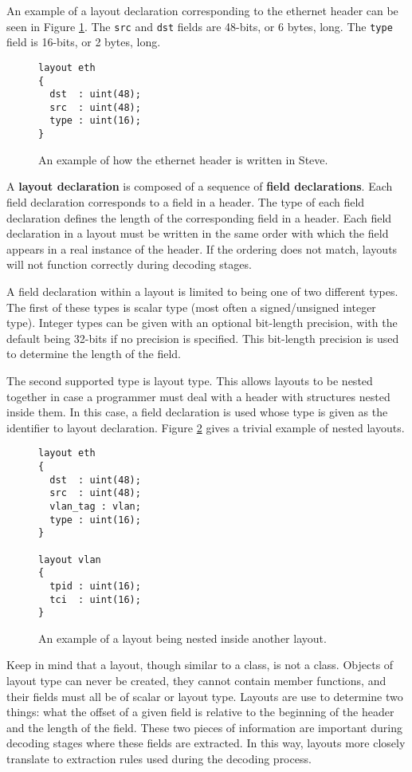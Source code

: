 An example of a layout declaration corresponding to the ethernet header \cite{eth_std} can be seen in Figure \ref{fg:ethernet_layout_ex}. The \texttt{src} and \texttt{dst} fields are 48-bits, or 6 bytes, long. The \texttt{type} field is 16-bits, or 2 bytes, long.

\begin{figure}
\begin{lstlisting}
layout eth
{
  dst  : uint(48);
  src  : uint(48);
  type : uint(16);
}
\end{lstlisting}
\caption{An example of how the ethernet header is written in Steve.}
\label{fg:ethernet_layout_ex}
\end{figure}

A \textbf{layout declaration} is composed of a sequence of \textbf{field declarations}. Each field declaration corresponds to a field in a header. The type of each field declaration defines the length of the corresponding field in a header. Each field declaration in a layout must be written in the same order with which the field appears in a real instance of the header. If the ordering does not match, layouts will not function correctly during decoding stages. 

A field declaration within a layout is limited to being one of two different types. The first of these types is scalar type (most often a signed/unsigned integer type). Integer types can be given with an optional bit-length precision, with the default being 32-bits if no precision is specified. This bit-length precision is used to determine the length of the field.

The second supported type is layout type. This allows layouts to be nested together in case a programmer must deal with a header with structures nested inside them. In this case, a field declaration is used whose type is given as the identifier to layout declaration. Figure \ref{fg:nested_layout_ex} gives a trivial example of nested layouts.

\begin{figure}
\begin{lstlisting}
layout eth
{
  dst  : uint(48);
  src  : uint(48);
  vlan_tag : vlan;
  type : uint(16);
}

layout vlan
{
  tpid : uint(16);
  tci  : uint(16);
}
\end{lstlisting}
\caption{An example of a layout being nested inside another layout.}
\label{fg:nested_layout_ex}
\end{figure}

Keep in mind that a layout, though similar to a class, is not a class. Objects of layout type can never be created, they cannot contain member functions, and their fields must all be of scalar or layout type. Layouts are use to determine two things: what the offset of a given field is relative to the beginning of the header and the length of the field. These two pieces of information are important during decoding stages where these fields are extracted. In this way, layouts more closely translate to extraction rules used during the decoding process. 

